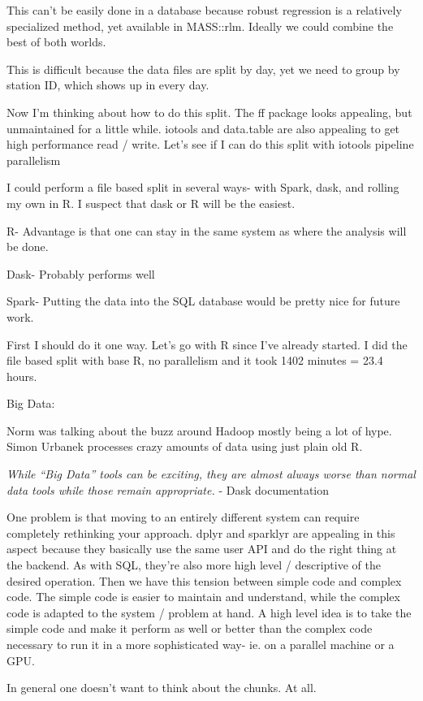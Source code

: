 \documentclass[12pt]{article}
\begin{document}
This can't be easily done in a database because robust regression is
a relatively specialized method, yet available in MASS::rlm.
Ideally we could combine the best of both worlds.

This is difficult because the data files are split by day, yet we
need to group by station ID, which shows up in every day.

Now I'm thinking about how to do this split. The ff package looks
appealing, but unmaintained for a little while. iotools and data.table
are also appealing to get high performance read / write. Let's see if I
can do this split with iotools pipeline parallelism

I could perform a file based split in several ways- with Spark, dask, and
rolling my own in R. I suspect that dask or R will be the easiest.

R- Advantage is that one can stay in the same system as where the analysis
will be done. 

Dask- Probably performs well

Spark- Putting the data into the SQL database would be pretty nice for
future work.

First I should do it one way. Let's go with R since I've already started.
I did the file based split with base R, no parallelism and it took 1402 minutes = 23.4 hours.

Big Data:

Norm was talking about the buzz around Hadoop mostly being a lot of hype.
Simon Urbanek processes crazy amounts of data using just plain old R.

\emph{While “Big Data” tools can be exciting, they are almost always worse than
normal data tools while those remain appropriate.} - Dask documentation

One problem is that moving to an entirely different system can require
completely rethinking your approach. dplyr and sparklyr are appealing in this
aspect because they basically use the same user API and do the right
thing at the backend. As with SQL, they're also more high level / descriptive of the
desired operation. Then we have this tension between simple code and
complex code. The simple code is easier to maintain and understand, while
the complex code is adapted to the system / problem at hand. A high level
idea is to take the simple code and make it perform as well or better than
the complex code necessary to run it in a more sophisticated way- ie. on a
parallel machine or a GPU.

In general one doesn't want to think about the chunks. At all.
\end{document}
